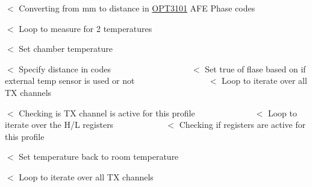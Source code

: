 $<$ Converting from mm to distance in \mbox{\hyperlink{namespace_o_p_t3101}{O\+P\+T3101}} A\+FE Phase codes

$<$ Loop to measure for 2 temperatures

$<$ Set chamber temperature

$<$ Specify distance in codes ~\newline
~\newline
~\newline
~\newline
~\newline
~\newline
~\newline
~\newline
~\newline
~\newline
~\newline
 $<$ Set true of flase based on if external temp sensor is used or not ~\newline
~\newline
~\newline
~\newline
~\newline
~\newline
~\newline
~\newline
~\newline
~\newline
 $<$ Loop to iterate over all TX channels

$<$ Checking is TX channel is active for this profile ~\newline
~\newline
~\newline
~\newline
~\newline
~\newline
~\newline
~\newline
 $<$ Loop to iterate over the H/L registers ~\newline
~\newline
~\newline
~\newline
~\newline
~\newline
~\newline
 $<$ Checking if registers are active for this profile

$<$ Set temperature back to room temperature

$<$ Loop to iterate over all TX channels

